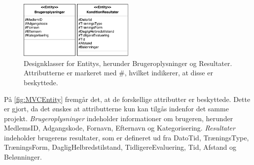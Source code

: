 \begin{figure} [H]
\centering
\includegraphics[width=0.5\textwidth]{figures/MVC/Entity}
\caption{Designklasser for Entitys, herunder Brugeroplysninger og Resultater. Attributterne er markeret med \#, hvilket indikerer, at disse er beskyttede.}
\label{fig:MVCEntity}
\end{figure}

\noindent
På \autoref{fig:MVCEntity} fremgår det, at de forskellige attributter er beskyttede. Dette er gjort, da det ønskes at attributterne kun kan tilgås indenfor det samme projekt. 
\textit{Brugeroplysninger} indeholder informationer om brugeren, herunder MedlemsID, Adgangskode, Fornavn, Efternavn og Kategorisering. 
\textit{Resultater} indeholder brugerens resultater, som er defineret ud fra DatoTid, TræningsType, TræningsForm, DagligHelbredstilstand, TidligereEvaluering, Tid, Afstand og Belønninger. 

